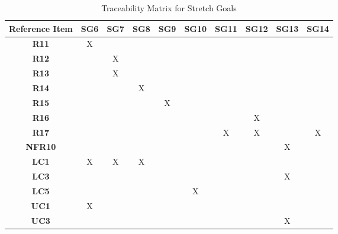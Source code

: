 \begin{table}[ht]
\centering
\begin{tabular}{|c|c|c|c|c|c|c|c|c|c|}
\hline
\textbf{Reference Item} & \textbf{SG6} & \textbf{SG7} & \textbf{SG8} & \textbf{SG9} & \textbf{SG10} & \textbf{SG11} & \textbf{SG12} & \textbf{SG13} & \textbf{SG14} \\ \hline
\textbf{R11} &X & & & & & & & & \\ \hline
\textbf{R12} & &X & & & & & & & \\ \hline
\textbf{R13} & &X & & & & & & & \\ \hline
\textbf{R14} & & &X & & & & & & \\ \hline
\textbf{R15} & & & &X & & & & & \\ \hline
\textbf{R16} & & & & & & &X & & \\ \hline
\textbf{R17} & & & & & &X &X & &X \\ \hline
\textbf{NFR10} & & & & & & & &X & \\ \hline
\textbf{LC1} &X &X &X & & & & & & \\ \hline
\textbf{LC3} & & & & & & & &X & \\ \hline
\textbf{LC5} & & & & &X & & & & \\ \hline
\textbf{UC1} &X & & & & & & & & \\ \hline
\textbf{UC3} & & & & & & & &X & \\ \hline
\end{tabular}
\caption{Traceability Matrix for Stretch Goals}
\label{table:stretch_goals_traceability}
\end{table}